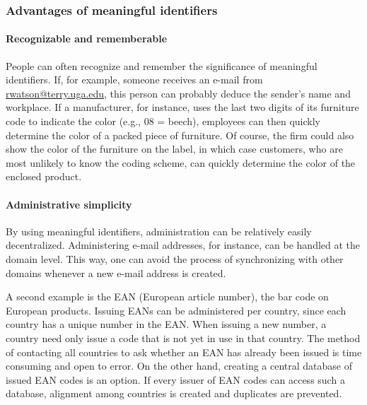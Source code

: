 \documentclass[
]{article}
\begin{document}
\hypertarget{advantages-of-meaningful-identifiers}{%
\subsubsection*{Advantages of meaningful identifiers}\label{advantages-of-meaningful-identifiers}}

\hypertarget{recognizable-and-rememberable}{%
\paragraph*{Recognizable and rememberable}\label{recognizable-and-rememberable}}

People can often recognize and remember the significance of meaningful
identifiers. If, for example, someone receives an e-mail from
\href{mailto:rwatson@terry.uga.edu}{\underline{rwatson@terry.uga.edu}}, this
person can probably deduce the sender's name and workplace. If a
manufacturer, for instance, uses the last two digits of its furniture
code to indicate the color (e.g., 08 = beech), employees can then
quickly determine the color of a packed piece of furniture. Of course,
the firm could also show the color of the furniture on the label, in
which case customers, who are most unlikely to know the coding scheme,
can quickly determine the color of the enclosed product.

\hypertarget{administrative-simplicity}{%
\paragraph*{Administrative simplicity}\label{administrative-simplicity}}

By using meaningful identifiers, administration can be relatively easily
decentralized. Administering e-mail addresses, for instance, can be
handled at the domain level. This way, one can avoid the process of
synchronizing with other domains whenever a new e-mail address is
created.

A second example is the EAN (European article number), the bar code on
European products. Issuing EANs can be administered per country, since
each country has a unique number in the EAN. When issuing a new number,
a country need only issue a code that is not yet in use in that country.
The method of contacting all countries to ask whether an EAN has already
been issued is time consuming and open to error. On the other hand,
creating a central database of issued EAN codes is an option. If every
issuer of EAN codes can access such a database, alignment among
countries is created and duplicates are prevented.
\end{document}
